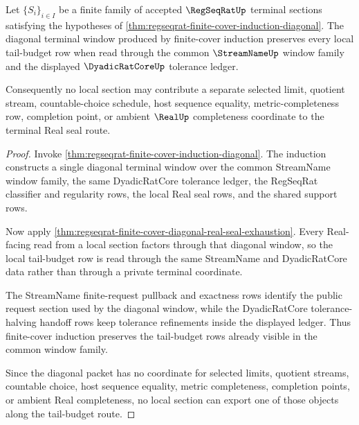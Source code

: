 \begin{theorem}
\label{thm:regseqrat-finite-cover-diagonal-tail-budget}
Let $\{S_i\}_{i \in I}$ be a finite family of accepted $\RegSeqRatUp$
terminal sections satisfying the hypotheses of
\autoref{thm:regseqrat-finite-cover-induction-diagonal}. The diagonal terminal
window produced by finite-cover induction preserves every local tail-budget row
when read through the common $\StreamNameUp$ window family and the displayed
$\DyadicRatCoreUp$ tolerance ledger.

Consequently no local section may contribute a separate selected limit,
quotient stream, countable-choice schedule, host sequence equality,
metric-completeness row, completion point, or ambient $\RealUp$ completeness
coordinate to the terminal Real seal route.
\end{theorem}
\begin{proof}
Invoke \autoref{thm:regseqrat-finite-cover-induction-diagonal}. The induction
constructs a single diagonal terminal window over the common StreamName window
family, the same DyadicRatCore tolerance ledger, the RegSeqRat classifier and
regularity rows, the local Real seal rows, and the shared support rows.

Now apply
\autoref{thm:regseqrat-finite-cover-diagonal-real-seal-exhaustion}. Every
Real-facing read from a local section factors through that diagonal window, so
the local tail-budget row is read through the same StreamName and DyadicRatCore
data rather than through a private terminal coordinate.

The StreamName finite-request pullback and exactness rows identify the public
request section used by the diagonal window, while the DyadicRatCore
tolerance-halving handoff rows keep tolerance refinements inside the displayed
ledger. Thus finite-cover induction preserves the tail-budget rows already
visible in the common window family.

Since the diagonal packet has no coordinate for selected limits, quotient
streams, countable choice, host sequence equality, metric completeness,
completion points, or ambient Real completeness, no local section can export
one of those objects along the tail-budget route.
\end{proof}
